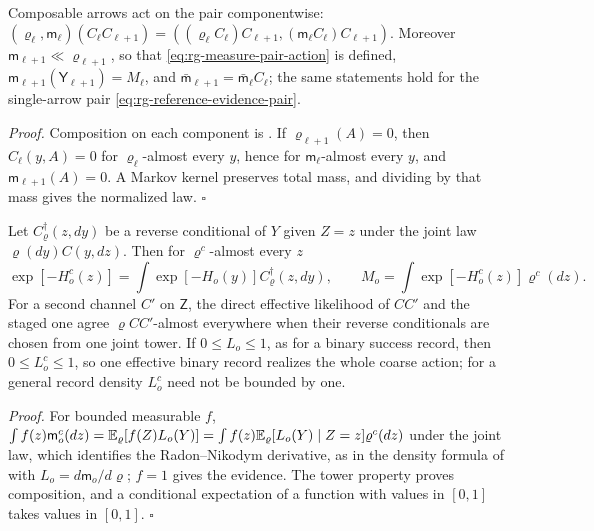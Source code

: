 Composable arrows act on the pair componentwise:
$(\varrho_\ell,\mathsf m_\ell)(C_\ell C_{\ell+1})
=((\varrho_\ell C_\ell)C_{\ell+1},(\mathsf m_\ell C_\ell)C_{\ell+1})$. Moreover
$\mathsf m_{\ell+1}\ll\varrho_{\ell+1}$, so that
\eqref{eq:rg-measure-pair-action} is defined, $\mathsf m_{\ell+1}(\mathsf
Y_{\ell+1})=M_\ell$, and $\bar{\mathsf m}_{\ell+1}=\bar{\mathsf m}_\ell C_\ell$; the
same statements hold for the single-arrow pair
\eqref{eq:rg-reference-evidence-pair}. 

\noindent\emph{Proof.}
Composition on each component is . If
$\varrho_{\ell+1}(A)=0$, then $C_\ell(y,A)=0$ for $\varrho_\ell$-almost every $y$,
hence for $\mathsf m_\ell$-almost every $y$, and $\mathsf m_{\ell+1}(A)=0$. A
Markov kernel preserves total mass, and dividing by that mass gives the normalized
law. $\square$

Let $C^\dagger_\varrho(z,dy)$ be a reverse conditional of $Y$ given $Z=z$ under
the joint law $\varrho(dy)C(y,dz)$. Then for $\varrho^c$-almost every $z$
\begin{equation}
\exp[-H_o^c(z)]
=\int\exp[-H_o(y)]C^\dagger_\varrho(z,dy),
\qquad
M_o=\int\exp[-H_o^c(z)]\varrho^c(dz).
\label{eq:rg-conditional-partition}
\end{equation}
For a second channel $C'$ on $\mathsf Z$, the direct effective likelihood of $CC'$
and the staged one agree $\varrho CC'$-almost everywhere when their reverse
conditionals are chosen from one joint tower. If $0\le L_o\le1$, as for a binary
success record, then $0\le L_o^c\le1$, so one effective binary record realizes the
whole coarse action; for a general record density $L_o^c$ need not be bounded by
one. 

\noindent\emph{Proof.}
For bounded measurable $f$, $\int f(z)\mathsf m_o^c(dz)=\mathbb E_\varrho[f(Z)L_o(Y)]
=\int f(z)\mathbb E_\varrho[L_o(Y)\mid Z=z]\varrho^c(dz)$ under the joint law, which
identifies the Radon--Nikodym derivative, as in the density formula of
 with $L_o=d\mathsf m_o/d\varrho$; $f=1$ gives the
evidence. The tower property proves composition, and a conditional expectation of
a function with values in $[0,1]$ takes values in $[0,1]$. $\square$

